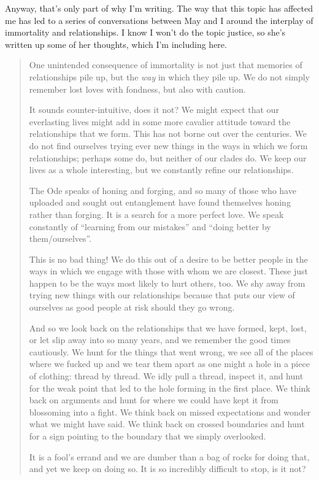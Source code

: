 Anyway, that's only part of why I'm writing. The way that this topic has affected me has led to a series of conversations between May and I around the interplay of immortality and relationships. I know I won't do the topic justice, so she's written up some of her thoughts, which I'm including here.

\begin{quote}
One unintended consequence of immortality is not just that memories of relationships pile up, but the \emph{way} in which they pile up. We do not simply remember lost loves with fondness, but also with caution.

It sounds counter-intuitive, does it not? We might expect that our everlasting lives might add in some more cavalier attitude toward the relationships that we form. This has not borne out over the centuries. We do not find ourselves trying ever new things in the ways in which we form relationships; perhaps some do, but neither of our clades do. We keep our lives as a whole interesting, but we constantly refine our relationships.

The Ode speaks of honing and forging, and so many of those who have uploaded and sought out entanglement have found themselves honing rather than forging. It is a search for a more perfect love. We speak constantly of ``learning from our mistakes'' and ``doing better by them/ourselves''.

This is no bad thing! We do this out of a desire to be better people in the ways in which we engage with those with whom we are closest. These just happen to be the ways most likely to hurt others, too. We shy away from trying new things with our relationships because that puts our view of ourselves as good people at risk should they go wrong.

And so we look back on the relationships that we have formed, kept, lost, or let slip away into so many years, and we remember the good times cautiously. We hunt for the things that went wrong, we see all of the places where we fucked up and we tear them apart as one might a hole in a piece of clothing: thread by thread. We idly pull a thread, inspect it, and hunt for the weak point that led to the hole forming in the first place. We think back on arguments and hunt for where we could have kept it from blossoming into a fight. We think back on missed expectations and wonder what we might have said. We think back on crossed boundaries and hunt for a sign pointing to the boundary that we simply overlooked.

It is a fool's errand and we are dumber than a bag of rocks for doing that, and yet we keep on doing so. It is so incredibly difficult to stop, is it not?


\end{quote}
